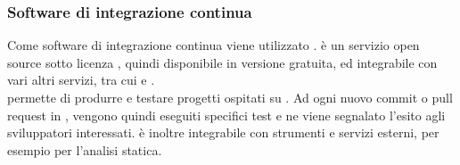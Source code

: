 \subsubsection{Software di integrazione continua}
Come software di integrazione continua viene utilizzato \textbf{}.
 è un servizio open source sotto licenza , quindi disponibile in versione gratuita,  ed integrabile con vari altri servizi, tra cui  e .\\  permette di produrre e testare progetti ospitati su . Ad ogni nuovo commit o pull request in , vengono quindi eseguiti specifici test e ne viene segnalato l'esito agli sviluppatori interessati.  è inoltre integrabile con strumenti e servizi esterni, per esempio per l'analisi statica.

